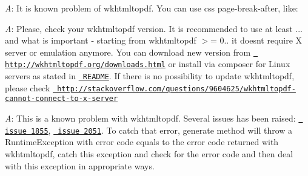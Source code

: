 {\itshape A}\+: It is known problem of {\ttfamily wkhtmltopdf}. You can use css {\ttfamily page-\/break-\/after}, like\+: 
\begin{DoxyCode}{0}
\DoxyCodeLine{    \}}
\DoxyCodeLine{}

\end{DoxyCode}



{\itshape A}\+: Please, check your {\ttfamily wkhtmltopdf} version. It is recommended to use at least {...} and what is important -\/ starting from {\ttfamily wkhtmltopdf \texorpdfstring{$>$}{>}= 0..} it doesn\textquotesingle{}t require X server or emulation anymore. You can download new version from \href{http://wkhtmltopdf.org/downloads.html}{\texttt{ http\+://wkhtmltopdf.\+org/downloads.\+html}} or install via composer for Linux servers as stated in \href{https://github.com/KnpLabs/snappy\#wkhtmltopdf-binary-as-composer-dependencies}{\texttt{ README}}. If there is no possibility to update {\ttfamily wkhtmltopdf}, please check \href{http://stackoverflow.com/questions/9604625/wkhtmltopdf-cannot-connect-to-x-server}{\texttt{ http\+://stackoverflow.\+com/questions/9604625/wkhtmltopdf-\/cannot-\/connect-\/to-\/x-\/server}}


{\itshape A}\+: This is a known problem with wkhtmltopdf. Several issues has been raised\+: \href{https://github.com/wkhtmltopdf/wkhtmltopdf/issues/1855}{\texttt{ issue 1855}}, \href{https://github.com/wkhtmltopdf/wkhtmltopdf/issues/2051}{\texttt{ issue 2051}}. To catch that error, {\ttfamily generate} method will throw a {\ttfamily Runtime\+Exception} with error code equals to the error code returned with wkhtmltopdf, catch this exception and check for the error code and then deal with this exception in appropriate ways.


